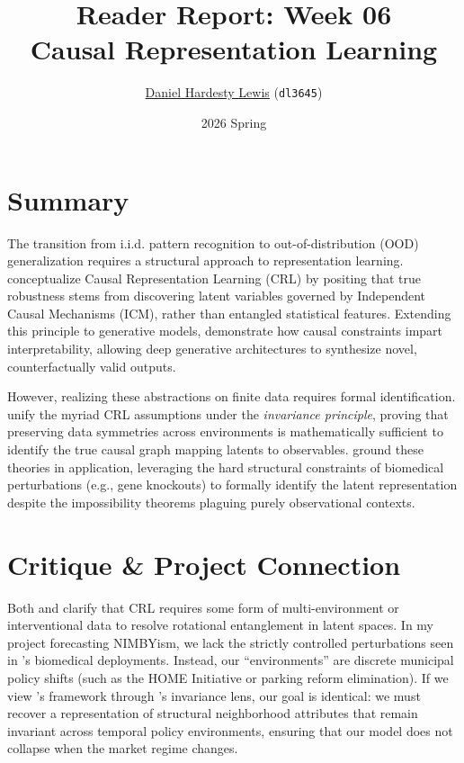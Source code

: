 \documentclass[11pt]{article}
\title{\vspace{-2.5em}\textbf{Reader Report: Week 06} \\ \vspace{0.1em} \large Causal Representation Learning}
\author{\href{https://github.com/dhardestylewis}{Daniel Hardesty Lewis} (\texttt{dl3645})}
\date{\vspace{-0.5em}2026 Spring}
\begin{document}
\maketitle
\thispagestyle{fancy}
\vspace{-1em}

\section*{Summary}
The transition from i.i.d. pattern recognition to out-of-distribution (OOD) generalization requires a structural approach to representation learning. \citet{scholkopf2021toward} conceptualize Causal Representation Learning (CRL) by positing that true robustness stems from discovering latent variables governed by Independent Causal Mechanisms (ICM), rather than entangled statistical features. Extending this principle to generative models, \citet{moran2025towards} demonstrate how causal constraints impart interpretability, allowing deep generative architectures to synthesize novel, counterfactually valid outputs. 

However, realizing these abstractions on finite data requires formal identification. \citet{yao2024unifying} unify the myriad CRL assumptions under the \textit{invariance principle}, proving that preserving data symmetries across environments is mathematically sufficient to identify the true causal graph mapping latents to observables. \citet{uhler2025causal} ground these theories in application, leveraging the hard structural constraints of biomedical perturbations (e.g., gene knockouts) to formally identify the latent representation despite the impossibility theorems plaguing purely observational contexts.

\section*{Critique \& Project Connection}
Both \citet{moran2025towards} and \citet{yao2024unifying} clarify that CRL requires some form of multi-environment or interventional data to resolve rotational entanglement in latent spaces. In my project forecasting NIMBYism, we lack the strictly controlled perturbations seen in \citet{uhler2025causal}'s biomedical deployments. Instead, our ``environments'' are discrete municipal policy shifts (such as the HOME Initiative or parking reform elimination). If we view \citeauthor{scholkopf2021toward}'s framework through \citeauthor{yao2024unifying}'s invariance lens, our goal is identical: we must recover a representation of structural neighborhood attributes that remain invariant across temporal policy environments, ensuring that our model does not collapse when the market regime changes.
\end{document}
